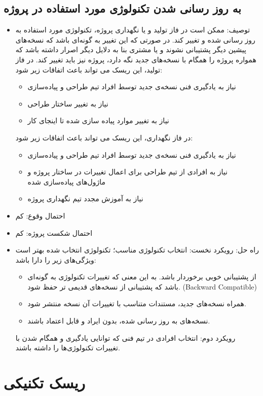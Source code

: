 \documentclass{article}
\begin{document}
\subsection{به روز رسانی شدن تکنولوژی مورد استفاده در پروژه}
\begin{itemize}
\item توصیف: ممکن است در فاز تولید و یا نگهداری پروژه، تکنولوژی مورد استفاده به روز رسانی شده و تغییر کند. در صورتی که این تغییر به گونه‌ای باشد که نسخه‌های پیشین دیگر پشتیبانی نشوند و یا مشتری بنا به دلایل دیگر اصرار داشته باشد که همواره پروژه را همگام با نسخه‌های جدید نگه دارد، پروژه نیز باید تغییر کند. در فاز تولید، این ریسک می تواند باعث اتفاقات زیر شود:
\begin{itemize}
\item نیاز به یادگیری فنی نسخه‌ی جدید توسط افراد تیم طراحی و پیاده‌سازی
\item نیاز به تغییر ساختار طراحی
\item  نیاز به تغییر موارد پیاده سازی شده تا اینجای کار
\end{itemize}
در فاز نگهداری، این ریسک می تواند باعث اتفاقات زیر شود:
\begin{itemize}
\item  نیاز به یادگیری فنی نسخه‌ی جدید توسط افراد تیم طراحی و پیاده‌سازی
\item نیاز به افرادی از تیم طراحی برای اعمال تغییرات در ساختار پروژه و ماژول‌های پیاده‌سازی شده
\item  نیاز به آموزش مجدد تیم نگهداری پروژه
\end{itemize}
\item احتمال وقوع: کم
\item احتمال شکست پروژه: کم
\item راه حل: رویکرد نخست: انتخاب تکنولوژی مناسب؛ تکنولوژی انتخاب شده بهتر است ویژگی‌های زیر را دارا باشد:
\begin{itemize}
\item از پشتیبانی خوبی برخوردار باشد. به این معنی که تغییرات تکنولوژی به گونه‌ای باشد که پشتیبانی از نسخه‌های قدیمی تر حفظ شود. (Backward Compatible)
\item  همراه نسخه‌های جدید، مستندات متناسب با تغییرات آن نسخه منتشر شود.
\item نسخه‌های به روز رسانی شده، بدون ایراد و قابل اعتماد باشند.
\end{itemize}
رویکرد دوم: انتخاب افرادی در تیم فنی که توانایی یادگیری و همگام شدن با تغییرات تکنولوژی‌ها را داشته باشند.
\end{itemize}

\newpage
\section{ریسک تکنیکی}
\end{document}
